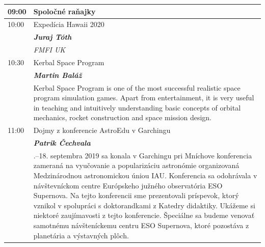 \documentclass[a4paper]{report}
\begin{document}
        \begin{tabularx}{\textwidth}{>{}p{2cm} >{\RaggedRight}X}
            \toprule
                            {\Large 09:00} & {\Large Spoločné raňajky} \\
                                                                                \midrule                            {\Large 10:00} & {\Large Expedícia Hawaii 2020} \\
                                            & \textit{\textbf{Juraj Tóth}} \\
                                                                & \textit{FMFI UK} \\
                                                            \midrule                            {\Large 10:30} & {\Large Kerbal Space Program} \\
                                            & \textit{\textbf{Martin Baláž}} \\
                                                                                    & Kerbal Space Program is one of the most successful realistic space program simulation games. Apart from entertainment, it is very useful in teaching and intuitively understanding basic concepts of orbital mechanics, rocket construction and space mission design.
 \\
                                        \midrule                            {\Large 11:00} & {\Large Dojmy z konferencie AstroEdu v Garchingu} \\
                                            & \textit{\textbf{Patrik Čechvala}} \\
                                                                                    & 16.--18. septembra 2019 sa konala v Garchingu pri Mníchove konferencia zameraná na vyučovanie a popularizáciu astronómie organizovaná Medzinárodnou astronomickou úniou IAU. Konferencia sa odohrávala v návštevníckom centre Európskeho južného observatória ESO Supernova. Na tejto konferencii sme prezentovali príspevok, ktorý vznikol v spolupráci s doktorandkami z Katedry didaktiky. Ukážeme si niektoré zaujímavosti z tejto konferencie. Špeciálne sa budeme venovať samotnému návšteníckemu centru ESO Supernova, ktoré pozostáva z planetária a výstavných plôch.
 \\
                                                                \bottomrule
        \end{tabularx}

            \section{\color[rgb]{0, 0.1, 0.4}{sobota}}
\end{document}
